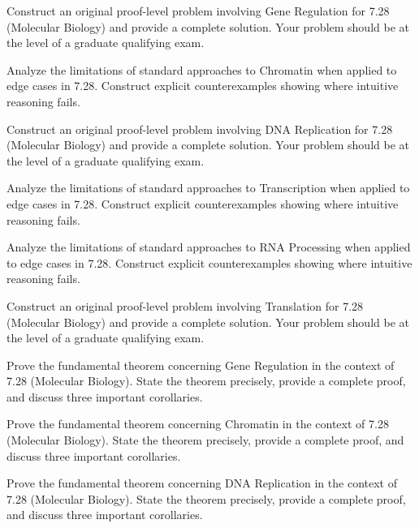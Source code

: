 \documentclass[12pt,a4paper]{exam}
\begin{document}
\begin{questions}
\vspace{0.3cm}

\question[3]
Construct an original proof-level problem involving Gene Regulation for 7.28 (Molecular Biology) and provide a complete solution. Your problem should be at the level of a graduate qualifying exam.

\vspace{0.3cm}

\question[3]
Analyze the limitations of standard approaches to Chromatin when applied to edge cases in 7.28. Construct explicit counterexamples showing where intuitive reasoning fails.

\vspace{0.3cm}

\question[3]
Construct an original proof-level problem involving DNA Replication for 7.28 (Molecular Biology) and provide a complete solution. Your problem should be at the level of a graduate qualifying exam.

\vspace{0.3cm}

\question[5]
Analyze the limitations of standard approaches to Transcription when applied to edge cases in 7.28. Construct explicit counterexamples showing where intuitive reasoning fails.

\vspace{0.3cm}

\question[4]
Analyze the limitations of standard approaches to RNA Processing when applied to edge cases in 7.28. Construct explicit counterexamples showing where intuitive reasoning fails.

\vspace{0.3cm}

\question[5]
Construct an original proof-level problem involving Translation for 7.28 (Molecular Biology) and provide a complete solution. Your problem should be at the level of a graduate qualifying exam.

\vspace{0.3cm}

\question[3]
Prove the fundamental theorem concerning Gene Regulation in the context of 7.28 (Molecular Biology). State the theorem precisely, provide a complete proof, and discuss three important corollaries.

\vspace{0.3cm}

\question[5]
Prove the fundamental theorem concerning Chromatin in the context of 7.28 (Molecular Biology). State the theorem precisely, provide a complete proof, and discuss three important corollaries.

\vspace{0.3cm}

\question[2]
Prove the fundamental theorem concerning DNA Replication in the context of 7.28 (Molecular Biology). State the theorem precisely, provide a complete proof, and discuss three important corollaries.

\vspace{0.3cm}

\end{questions}
\end{document}
